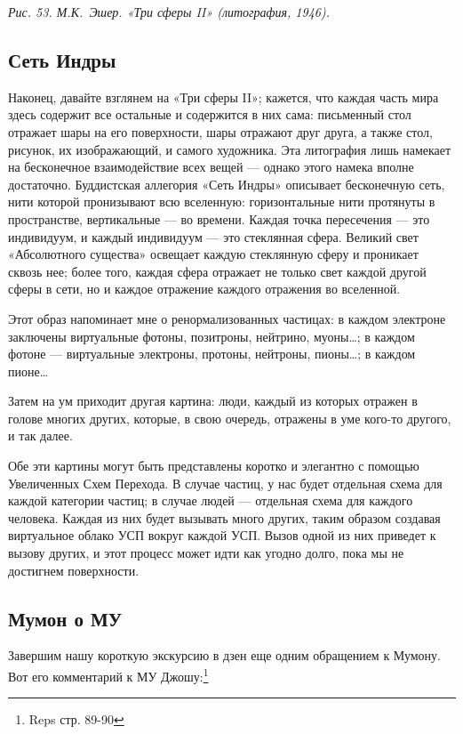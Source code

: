 \documentclass[../main.tex]{subfiles}
\begin{document}
\emph{Рис. 53. М.К.~Эшер. «Три сферы II» (литография, 1946).}


\subsection{Сеть Индры}

Наконец, давайте взглянем на «Три сферы II»; кажется, что каждая часть мира здесь содержит все остальные и содержится в них сама: письменный стол отражает шары на его поверхности, шары отражают друг друга, а также стол, рисунок, их изображающий, и самого художника. Эта литография лишь намекает на бесконечное взаимодействие всех вещей --- однако этого намека вполне достаточно. Буддистская аллегория «Сеть Индры» описывает бесконечную сеть, нити которой пронизывают всю вселенную: горизонтальные нити протянуты в пространстве, вертикальные --- во времени. Каждая точка пересечения --- это индивидуум, и каждый индивидуум --- это стеклянная сфера. Великий свет «Абсолютного существа» освещает каждую стеклянную сферу и проникает сквозь нее; более того, каждая сфера отражает не только свет каждой другой сферы в сети, но и каждое отражение каждого отражения во вселенной.

Этот образ напоминает мне о ренормализованных частицах: в каждом электроне заключены виртуальные фотоны, позитроны, нейтрино, муоны\ldots; в каждом фотоне --- виртуальные электроны, протоны, нейтроны, пионы\ldots; в каждом пионе\ldots{}

Затем на ум приходит другая картина: люди, каждый из которых отражен в голове многих других, которые, в свою очередь, отражены в уме кого-то другого, и так далее.

Обе эти картины могут быть представлены коротко и элегантно с помощью Увеличенных Схем Перехода. В случае частиц, у нас будет отдельная схема для каждой категории частиц; в случае людей --- отдельная схема для каждого человека. Каждая из них будет вызывать много других, таким образом создавая виртуальное облако УСП вокруг каждой УСП. Вызов одной из них приведет к вызову других, и этот процесс может идти как угодно долго, пока мы не достигнем поверхности.


\subsection{Мумон о МУ}

Завершим нашу короткую экскурсию в дзен еще одним обращением к Мумону. Вот его комментарий к МУ Джошу:\footnote{Reps стр. 89-90}
\end{document}

